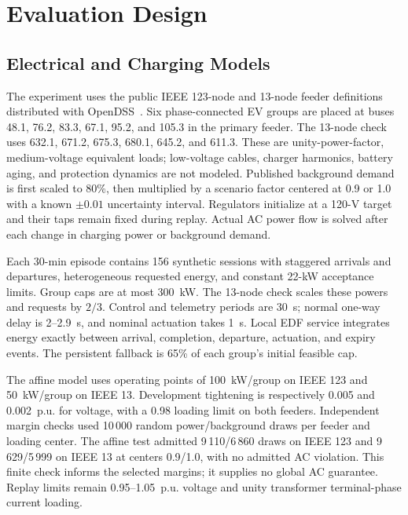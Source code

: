 \section{Evaluation Design}
\label{sec:evaluation}
\subsection{Electrical and Charging Models}
The experiment uses the public IEEE 123-node and 13-node feeder definitions
distributed with OpenDSS~\cite{epriopendss}. Six phase-connected EV groups are
placed at buses 48.1, 76.2, 83.3, 67.1, 95.2, and 105.3 in the primary feeder.
The 13-node check uses 632.1, 671.2, 675.3, 680.1, 645.2, and 611.3.
These are unity-power-factor, medium-voltage equivalent loads; low-voltage
cables, charger harmonics, battery aging, and protection dynamics are not modeled.
Published background demand is first scaled to 80\%, then multiplied by a
scenario factor centered at 0.9 or 1.0 with a known $\pm0.01$ uncertainty
interval. Regulators initialize at a 120-V target and their taps remain fixed
during replay. Actual AC power flow is solved after each change in charging power
or background demand.

Each 30-min episode contains 156 synthetic sessions with staggered arrivals and
departures, heterogeneous requested energy, and constant 22-kW acceptance limits.
Group caps are at most 300~kW. The 13-node check scales these powers and requests
by $2/3$. Control and telemetry periods are 30~s; normal one-way delay is
2--2.9~s, and nominal actuation takes 1~s. Local EDF service integrates energy
exactly between arrival, completion, departure, actuation, and expiry events.
The persistent fallback is 65\% of each group's initial feasible cap.

The affine model uses operating points of 100~kW/group on IEEE 123 and
50~kW/group on IEEE 13. Development tightening is respectively 0.005 and
0.002~p.u. for voltage, with a 0.98 loading limit on both feeders. Independent
margin checks used 10\,000 random power/background draws per feeder and loading
center. The affine test admitted 9\,110/6\,860 draws on IEEE 123 and
9\,629/5\,999 on IEEE 13 at centers 0.9/1.0, with no admitted AC violation.
This finite check informs the selected margins; it supplies no global AC guarantee.
Replay limits remain 0.95--1.05~p.u. voltage and unity transformer terminal-phase
current loading.


